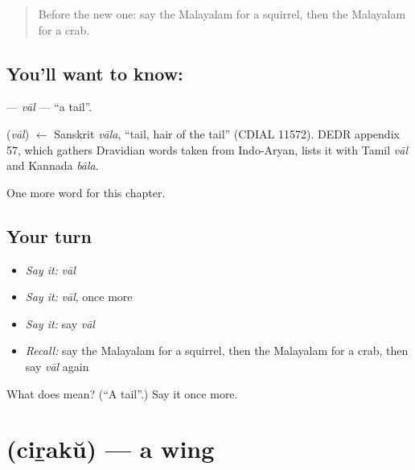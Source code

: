 \label{lesson:ML-C254-val}



\begin{quote}
Before the new one: say the Malayalam for a squirrel, then the Malayalam for a crab.
\end{quote}

\subsection*{You'll want to know: }
\textbf{} — \emph{vāl} — \textquotedblleft{}a tail\textquotedblright{}.

\begin{cousinweb}
\textbf{} (\emph{vāl}) $\leftarrow$ Sanskrit \emph{vāla}, \textquotedblleft{}tail, hair of the tail\textquotedblright{} (CDIAL 11572). DEDR appendix 57, which gathers Dravidian words taken from Indo-Aryan, lists it with Tamil \emph{vāl} and Kannada \emph{bāla}.
\end{cousinweb}

\begin{grammarlens}[title={What you've built}]
One more word for this chapter.
\end{grammarlens}

\subsection*{Your turn}
\begin{itemize}
\raggedright
  \item \emph{Say it:} \emph{vāl}
  \item \emph{Say it:} \emph{vāl}, once more
  \item \emph{Say it:} say \emph{vāl}
  \item \emph{Recall:} say the Malayalam for a squirrel, then the Malayalam for a crab, then say \emph{vāl} again
\end{itemize}

\begin{tcolorbox}[breakable,colback=teal!4,colframe=teal!35!black,title={Before you move on}]
What does  mean? (\textquotedblleft{}A tail\textquotedblright{}.) Say it once more.
\end{tcolorbox}
\section[\texorpdfstring{\ml{ചിറക്} (ciṟakŭ)}{ചിറക് (ciṟakŭ)}]{ (ciṟakŭ) — a wing}

